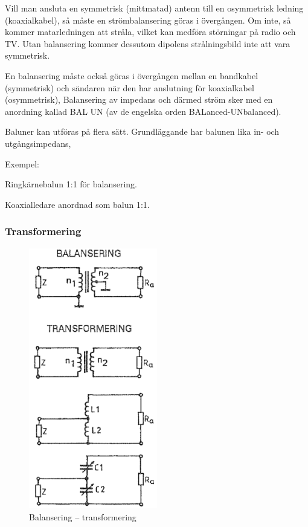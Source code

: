 Vill man ansluta en symmetrisk (mittmatad) antenn till en osymmetrisk
ledning (koaxialkabel), så måste en strömbalansering göras i
övergången. Om inte, så kommer matarledningen att stråla, vilket kan
medföra störningar på radio och TV. Utan balansering kommer dessutom
dipolens strålningsbild inte att vara symmetrisk.

En balansering måste också göras i övergången mellan en bandkabel
(symmetrisk) och sändaren när den har anslutning för koaxialkabel
(osymmetrisk), Balansering av impedans och därmed ström sker med en
anordning kallad BAL UN (av de engelska orden BALanced-UNbalanced).

Baluner kan utföras på flera sätt. Grundläggande har balunen lika in-
och utgångsimpedans,

Exempel:

Ringkärnebalun 1:1 för balansering.

Koaxialledare anordnad som balun 1:1.

\subsubsection{Transformering}

\begin{figure}
  \includegraphics[width=0.5\textwidth]{images/cropped_pdfs/bild_2_6-28.pdf}
  \caption{Balansering -- transformering}
  \label{fig:bildII6-28}
\end{figure}

